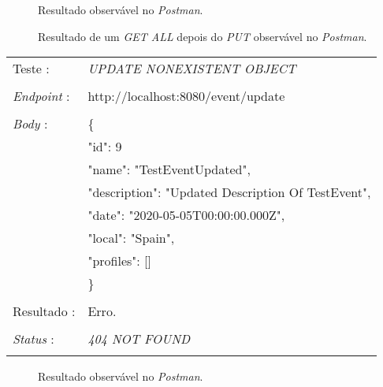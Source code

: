 \begin{figure}[h]
	\begin{center}
	\end{center}
	\caption{Resultado observável no \emph{Postman}.}\label{fig:eventput}
\end{figure}
\newpage
\begin{figure}[h]
	\begin{center}
	\end{center}
	\caption{Resultado de um \emph{GET ALL} depois do \emph{PUT} observável no \emph{Postman}.}\label{fig:eventallafterput}
\end{figure}
\newpage

\begin{tabular}{ll}
	Teste : & \emph{UPDATE NONEXISTENT OBJECT}\\
	\\
	\emph{Endpoint} : & http://localhost:8080/event/update\\
	\\
	\emph{Body} : & \{ \\
	& "id": 9 \\
	& "name": "TestEventUpdated",\\
	& "description": "Updated Description Of TestEvent",\\
	& "date": "2020-05-05T00:00:00.000Z",\\
	& "local": "Spain",\\
	& "profiles": []\\
	& \} \\
	\\
	Resultado : & Erro.\\
	\\
	\emph{Status} : & \emph{404 NOT FOUND}\\
	\\
\end{tabular}

\begin{figure}[h]
	\begin{center}
	\end{center}
	\caption{Resultado observável no \emph{Postman}.}\label{fig:eventput404}
\end{figure}
\newpage

